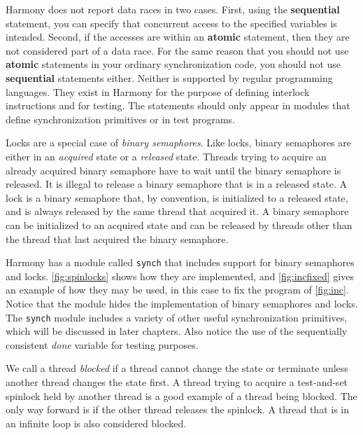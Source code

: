 \documentclass{report}
\begin{document}
Harmony does not report data races in two cases.
First, using the \textbf{sequential} statement, you can specify that
concurrent access to the specified variables is intended.
Second, if the accesses are within an \textbf{atomic} statement, then they
are not considered part of a data race.
For the same reason that you should not use \textbf{atomic}
statements in your ordinary synchronization code, you should not use
\textbf{sequential} statements either.  Neither is supported by regular
programming languages.  They exist in Harmony for the purpose of
defining interlock instructions and for testing.
The statements should only appear in modules that define synchronization
primitives or in test programs.

Locks are a special case of \emph{binary semaphores}.
Like locks, binary semaphores are either in an \emph{acquired} state
or a \emph{released} state.
Threads trying to acquire an already acquired binary semaphore
have to wait until the binary semaphore is released.
It is illegal to release a binary semaphore that is in a released
state.
A lock is a binary semaphore that, by convention, is initialized to a
released state, and is always released by the same thread that acquired it.
A binary semaphore can be initialized to an acquired state and can be
released by threads other than the thread that last acquired the
binary semaphore.

Harmony has a module called \texttt{synch} that includes support for
binary semaphores and locks.
\autoref{fig:spinlocks} shows how they are implemented, and
\autoref{fig:incfixed} gives an example of how they may be used,
in this case to fix the program of \autoref{fig:inc}.
Notice that the module hides the implementation of
binary semaphores and locks.
The \texttt{synch} module includes a variety of other useful
synchronization primitives, which will be discussed in later
chapters.
Also notice the use of the sequentially consistent \textit{done}
variable for testing purposes.

%

We call a thread \emph{blocked}
%
if a thread cannot change the state or terminate unless
another thread changes the state first.
A thread trying to
acquire a test-and-set spinlock held by another thread is a good example
of a thread being blocked.
The only way forward is if the other thread releases the spinlock.
A thread that is in an infinite loop is also considered blocked.
\end{document}
